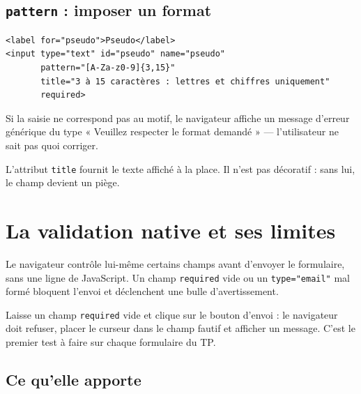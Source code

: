 \documentclass[a4paper,11pt]{article}
\begin{document}
\subsection{\texttt{pattern} : imposer un format}

\begin{lstlisting}[language=HTML5, caption={Un pseudo de 3 à 15 caractères, lettres et chiffres seulement}]
<label for="pseudo">Pseudo</label>
<input type="text" id="pseudo" name="pseudo"
       pattern="[A-Za-z0-9]{3,15}"
       title="3 à 15 caractères : lettres et chiffres uniquement"
       required>
\end{lstlisting}

\begin{tcolorbox}[attention, title={\texttt{pattern} sans \texttt{title} est inutilisable}]
Si la saisie ne correspond pas au motif, le navigateur affiche un message d'erreur générique du type « Veuillez respecter le format demandé » --- l'utilisateur ne sait pas quoi corriger.

\vspace{3pt}
L'attribut \texttt{title} fournit le texte affiché à la place. Il n'est pas décoratif : sans lui, le champ devient un piège.
\end{tcolorbox}

\section{La validation native et ses limites}

Le navigateur contrôle lui-même certains champs avant d'envoyer le formulaire, sans une ligne de JavaScript. Un champ \texttt{required} vide ou un \texttt{type="email"} mal formé bloquent l'envoi et déclenchent une bulle d'avertissement.

\begin{tcolorbox}[astuce, title={Tester la validation}]
Laisse un champ \texttt{required} vide et clique sur le bouton d'envoi : le navigateur doit refuser, placer le curseur dans le champ fautif et afficher un message. C'est le premier test à faire sur chaque formulaire du TP.
\end{tcolorbox}

\subsection{Ce qu'elle apporte}
\end{document}
